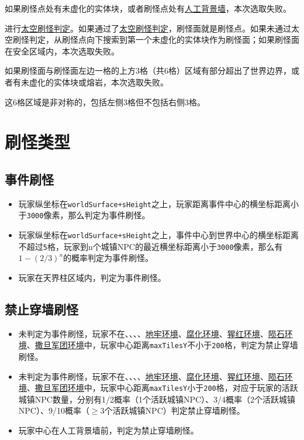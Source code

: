 如果刷怪点处有未虚化的实体块，或者刷怪点处有\hyperref[app39]{人工背景墙}，本次选取失败。

进行\hyperref[app22]{太空刷怪判定}。如果通过了\hyperref[app22]{太空刷怪判定}，刷怪面就是刷怪点。如果未通过太空刷怪判定，从刷怪点向下搜索到第一个未虚化的实体块作为刷怪面；如果刷怪面在安全区域内，本次选取失败。

如果刷怪面与刷怪面左边一格的上方3格（共6格）区域有部分超出了世界边界，或者有未虚化的实体块或熔岩，本次选取失败。

\begin{remark}
这6格区域是非对称的，包括左侧3格但不包括右侧3格。
\end{remark}

\section{刷怪类型}

\subsection{事件刷怪}\label{app38}
\begin{itemize}
    \item 玩家纵坐标在\lstinline{worldSurface+sHeight}之上，玩家距离事件中心的横坐标距离小于\lstinline{3000}像素，那么判定为事件刷怪。
    \item 玩家纵坐标在\lstinline{worldSurface+sHeight}之上，事件中心到世界中心的横坐标距离不超过\lstinline{5}格，玩家到n个城镇NPC的最近横坐标距离小于\lstinline{3000}像素，那么有$1-(2/3)^n$的概率判定为事件刷怪。
    \item 玩家在天界柱区域内，判定为事件刷怪。
\end{itemize}

\subsection{禁止穿墙刷怪}\label{app42}
\begin{itemize}
    \item 未判定为事件刷怪，玩家不在、、、、\hyperref[app37]{地牢环境}、\hyperref[app37]{腐化环境}、\hyperref[app37]{猩红环境}、\hyperref[app37]{陨石环境}、\hyperref[app37]{撒旦军团环境}中，玩家中心距离\lstinline{maxTilesY}不小于\lstinline{200}格，判定为禁止穿墙刷怪。
    \item 未判定为事件刷怪，玩家不在、、、、\hyperref[app37]{地牢环境}、\hyperref[app37]{腐化环境}、\hyperref[app37]{猩红环境}、\hyperref[app37]{陨石环境}、\hyperref[app37]{撒旦军团环境}中，玩家中心距离\lstinline{maxTilesY}小于\lstinline{200}格，对应于玩家的活跃城镇NPC数量，分别有1/2概率（1个活跃城镇NPC）、3/4概率（2个活跃城镇NPC）、9/10概率（$\ge$3个活跃城镇NPC）判定禁止穿墙刷怪。
    \item 玩家中心在人工背景墙前，判定为禁止穿墙刷怪。
\end{itemize}


